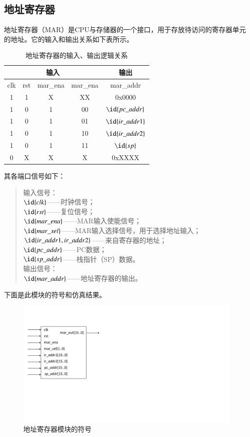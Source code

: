 \documentclass[titlepage, 11pt]{article}
\begin{document}
	\subsection{地址寄存器}
	地址寄存器（MAR）是CPU与存储器的一个接口，用于存放待访问的寄存器单元的地址。它的输入和输出关系如下表所示。
		\begin{table}[htb]
		\centering
		\caption{地址寄存器的输入、输出逻辑关系}
		\begin{tabular}{c|c|c|c|c}
			\multicolumn{4}{c|}{输入}         & 输出              \\ \hline
			clk & rst & mar\_ena & mar\_ena & mar\_addr       \\ \hline
			1   & 1   & X        & XX       & 0x0000          \\ \hline
			1   & 0   & 1        & 00       & $\id{pc\_addr}$  \\ \hline
			1   & 0   & 1        & 01       & $\id{ir\_addr1}$ \\ \hline
			1   & 0   & 1        & 10       & $\id{ir\_addr2}$ \\ \hline
			1   & 0   & 1        & 11       & $\id{sp}$       \\ \hline
			0   & X   & X        & X        & 0xXXXX         
		\end{tabular}
	\end{table}\par 
		其各端口信号如下：
		\begin{quote}
		输入信号：\\
		$\id{clk}$——时钟信号；\\
		$\id{rst}$——复位信号；\\
		$\id{mar\_ena}$——MAR输入使能信号；\\
		$\id{mar\_sel}$——MAR输入选择信号，用于选择地址输入；\\
		$\id{ir\_addr1,ir\_addr2}$——来自寄存器的地址；\\
		$\id{pc\_addr}$——PC数据；\\
		$\id{sp\_addr}$——栈指针（SP）数据。\\
		输出信号：\\
		$\id{mar\_addr}$——地址寄存器的输出。
		\end{quote}
		下面是此模块的符号和仿真结果。
		\begin{figure}[H]
		
				\centering
				\includegraphics[scale=0.5]{21.pdf}
				\caption{地址寄存器模块的符号}
		\end{figure}	
\end{document}
